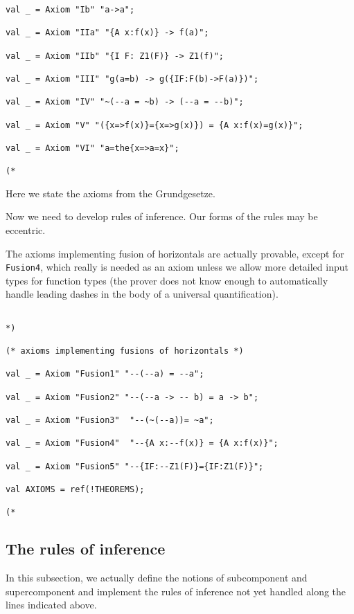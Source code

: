 \documentclass{article}
\begin{document}
{{\begin{verbatim}
val _ = Axiom "Ib" "a->a";

val _ = Axiom "IIa" "{A x:f(x)} -> f(a)";

val _ = Axiom "IIb" "{I F: Z1(F)} -> Z1(f)";

val _ = Axiom "III" "g(a=b) -> g({IF:F(b)->F(a)})";

val _ = Axiom "IV" "~(--a = ~b) -> (--a = --b)";

val _ = Axiom "V" "({x=>f(x)}={x=>g(x)}) = {A x:f(x)=g(x)}";

val _ = Axiom "VI" "a=the{x=>a=x}";

(*

\end{verbatim}

Here we state the axioms from the Grundgesetze.

Now we need to develop rules of inference.  Our forms of the rules may be eccentric.

The axioms implementing fusion of horizontals are actually provable, except for {\tt Fusion4}, which really is needed as an axiom unless we allow more detailed input types for function types (the prover does not know enough to automatically handle leading dashes in the body of a universal quantification).

\begin{verbatim}

*)

(* axioms implementing fusions of horizontals *)

val _ = Axiom "Fusion1" "--(--a) = --a";

val _ = Axiom "Fusion2" "--(--a -> -- b) = a -> b";

val _ = Axiom "Fusion3"  "--(~(--a))= ~a";

val _ = Axiom "Fusion4"  "--{A x:--f(x)} = {A x:f(x)}";

val _ = Axiom "Fusion5" "--{IF:--Z1(F)}={IF:Z1(F)}";

val AXIOMS = ref(!THEOREMS);

(*

\end{verbatim}

\subsection{The rules of inference}

In this subsection, we actually define the notions of subcomponent and supercomponent and implement the rules of inference not yet handled along the lines indicated above.

}}
\end{document}
